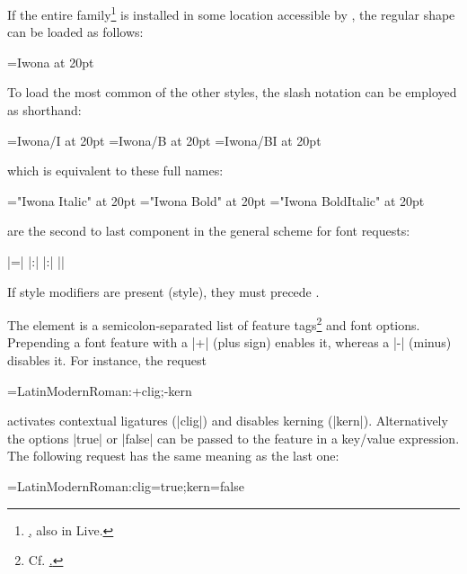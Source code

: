 If the entire  family\footnote{%
  \hyperlink {http://jmn.pl/kurier-i-iwona/},
  also in \TEX Live.
}
is installed in some location accessible by ,
the regular shape can be loaded as follows:

\beginlisting
  \font\iwona=Iwona at 20pt
\endlisting

\noindent
To load the most common of the other styles, the slash notation can
be employed as shorthand:

\beginlisting
  \font\iwonaitalic    =Iwona/I    at 20pt
  \font\iwonabold      =Iwona/B    at 20pt
  \font\iwonabolditalic=Iwona/BI   at 20pt
\endlisting

\noindent
which is equivalent to these full names:

\beginlisting
  \font\iwonaitalic    ="Iwona Italic"       at 20pt
  \font\iwonabold      ="Iwona Bold"         at 20pt
  \font\iwonabolditalic="Iwona BoldItalic"   at 20pt
\endlisting

\endsubsubsection
\endsubsection
\endsection


 are the second to last component in the
general scheme for font requests:

\beginnarrower
      |\font\foo={|%
      |:|%
      |:|%
      |}|%
\endnarrower

\noindent
If style modifiers are present (\XETEX style), they must precede
.

The element  is a semicolon-separated list of feature
tags\footnote{%
  Cf. \hyperlink {http://www.microsoft.com/typography/otspec/featurelist.htm}.
}
and font options.
%
Prepending a font feature with a |+| (plus sign) enables it, whereas
a |-| (minus) disables it. For instance, the request

\beginlisting
  \font\test=LatinModernRoman:+clig;-kern
\endlisting

\noindent activates contextual ligatures (|clig|) and disables
kerning (|kern|).
%
Alternatively the options |true| or |false| can be passed to
the feature in a key/value expression.
%
The following request has the same meaning as the last one:

\beginlisting
  \font\test=LatinModernRoman:clig=true;kern=false
\endlisting

